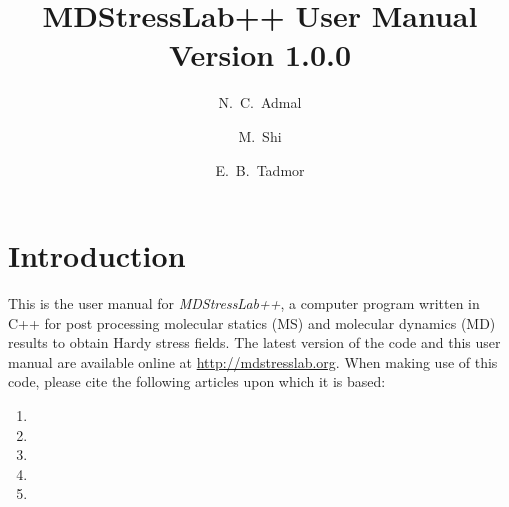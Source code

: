 \documentclass[authoryear]{elsarticle}
\newcommand{\MDStressLab}{\emph{MDStressLab++}\xspace}
\begin{document}
\begin{frontmatter}


\title{MDStressLab++ User Manual Version 1.0.0}


\author[UIUC]{N.~C.~Admal}
\author[UMN]{M.~Shi}
\author[UMN]{E.~B.~Tadmor}

\address[UMN]{Department of Aerospace Engineering and Mechanics, University of Minnesota, Minneapolis, MN 55455, USA}
\address[UIUC]{Department of Mechanical Science and Engineering, University of Illinois at Urbana-Champaign, Urbana, IL 61801, USA}

\end{frontmatter}

\section{Introduction}
\label{sec:intro}
This is the user manual for \MDStressLab, a computer program written in C++ for post processing molecular statics (MS) and molecular dynamics (MD) results to obtain Hardy stress fields.  The latest version of the code and this user manual are available online at \url{http://mdstresslab.org}. When making use of this code, please cite the following articles upon which it is based:
\begin{enumerate}
    \item {}
    \item {}
    \item {}
    \item {}
    \item {}
\end{enumerate}
\end{document}
